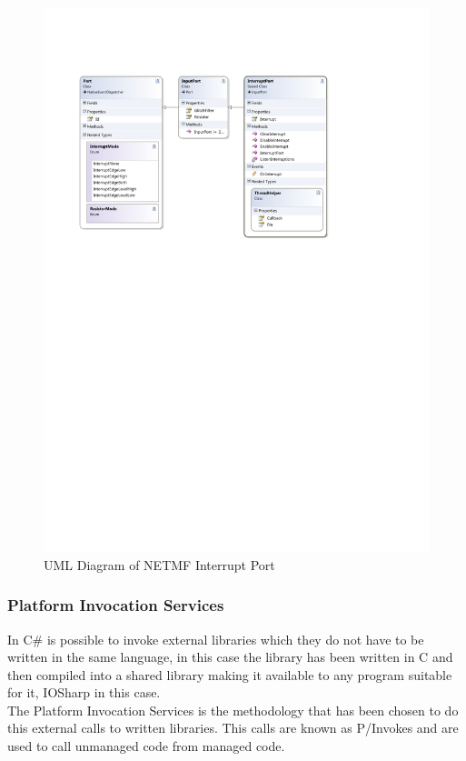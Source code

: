 \begin{figure}[H]\begin{center}
 \centering
  \captionsetup{justification=centering}
  \includegraphics[width=1\textwidth]{pictures/iosharp/interrupt-uml}
  \caption{UML Diagram of NETMF Interrupt Port \label{fig:interrupt-uml}}
\end{center}\end{figure}

\subsubsection{Platform Invocation Services}\label{SSS:IOSharp-Interrupt-PInvoke}
In C\# is possible to invoke external libraries which they do not have to be written in the same language, in this case the library has been written in C and then compiled into a shared library making it available to any program suitable for it, IOSharp in this case.
\\
The Platform Invocation Services is the methodology that has been chosen to do this external calls to written libraries. This calls are known as P/Invokes and are used to call unmanaged code from managed code. 

